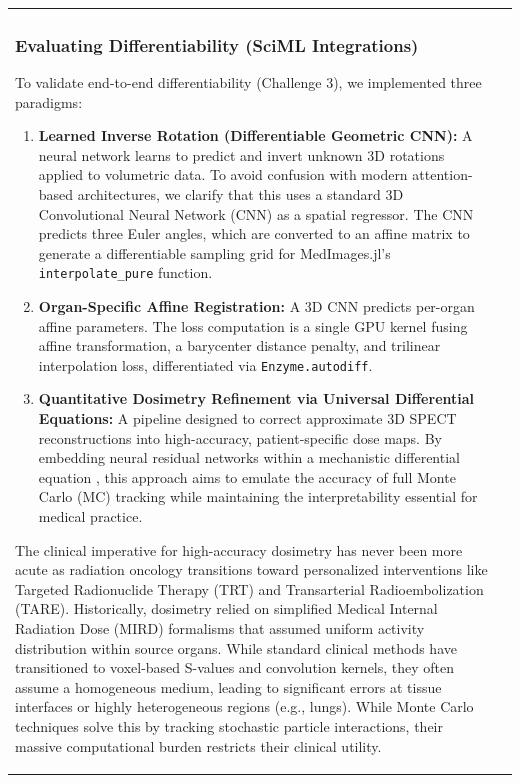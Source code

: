 \documentclass[10pt,letterpaper]{article}
\begin{document}
\begin{table}[H]
\begin{tabular}{|p{}|p{}|}
\subsubsection*{Evaluating Differentiability (SciML Integrations)}
To validate end-to-end differentiability (Challenge 3), we implemented three paradigms:
\begin{enumerate}
    \item \textbf{Learned Inverse Rotation (Differentiable Geometric CNN):} A neural network learns to predict and invert unknown 3D rotations applied to volumetric data. To avoid confusion with modern attention-based architectures, we clarify that this uses a standard 3D Convolutional Neural Network (CNN) as a spatial regressor. The CNN predicts three Euler angles, which are converted to an affine matrix to generate a differentiable sampling grid for MedImages.jl's \texttt{interpolate\_pure} function. 
    \item \textbf{Organ-Specific Affine Registration:} A 3D CNN predicts per-organ affine parameters. The loss computation is a single GPU kernel fusing affine transformation, a barycenter distance penalty, and trilinear interpolation loss, differentiated via \texttt{Enzyme.autodiff}.
    \item \textbf{Quantitative Dosimetry Refinement via Universal Differential Equations:} A pipeline designed to correct approximate 3D SPECT reconstructions into high-accuracy, patient-specific dose maps. By embedding neural residual networks within a mechanistic differential equation \cite{Berman_2024}, this approach aims to emulate the accuracy of full Monte Carlo (MC) tracking while maintaining the interpretability essential for medical practice.
\end{enumerate}

The clinical imperative for high-accuracy dosimetry has never been more acute as radiation oncology transitions toward personalized interventions like Targeted Radionuclide Therapy (TRT) and Transarterial Radioembolization (TARE). Historically, dosimetry relied on simplified Medical Internal Radiation Dose (MIRD) formalisms that assumed uniform activity distribution within source organs. While standard clinical methods have transitioned to voxel-based S-values and convolution kernels, they often assume a homogeneous medium, leading to significant errors at tissue interfaces or highly heterogeneous regions (e.g., lungs). While Monte Carlo techniques solve this by tracking stochastic particle interactions, their massive computational burden restricts their clinical utility.


\end{tabular}
\end{table}
\end{document}
